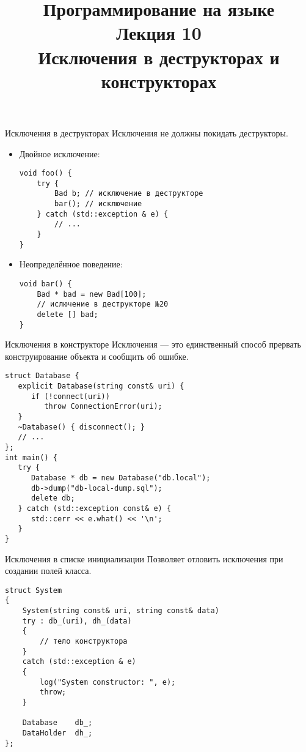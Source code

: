 \documentclass[aspectration=1610,t]{beamer}
\title{{\bf Программирование на языке \langcpp\protect\\Лекция
10\protect\vspace{1em}\\}Исключения в деструкторах и конструкторах}
\begin{document}
\begin{frame} 
  \titlepage
\end{frame}

\begin{frame}[fragile]{Исключения в деструкторах}
Исключения не должны покидать деструкторы.
\begin{itemize}
\item Двойное исключение:
\begin{lstlisting}
void foo() {
    try {
        Bad b; // исключение в деструкторе
        bar(); // исключение
    } catch (std::exception & e) {
        // ...
    }
}
\end{lstlisting}
\item Неопределённое поведение:
\begin{lstlisting}
void bar() {
    Bad * bad = new Bad[100];
    // ислючение в деструкторе №20
    delete [] bad;
}
\end{lstlisting}
\end{itemize}
\end{frame}

\begin{frame}[fragile]{Исключения в конструкторе}
Исключения — это единственный способ
прервать\\ конструирование объекта и сообщить об ошибке.

\begin{lstlisting}
struct Database {
   explicit Database(string const& uri) {
      if (!connect(uri))
         throw ConnectionError(uri);
   }
   ~Database() { disconnect(); }
   // ...
};
int main() {
   try {
      Database * db = new Database("db.local");
      db->dump("db-local-dump.sql");
      delete db;
   } catch (std::exception const& e) {
      std::cerr << e.what() << '\n';
   }
}

\end{lstlisting}
\end{frame}

\begin{frame}[fragile]{Исключения в списке инициализации}
Позволяет отловить исключения при создании полей класса.
\begin{lstlisting}
struct System 
{
    System(string const& uri, string const& data)
    try : db_(uri), dh_(data)
    {
        // тело конструктора
    }
    catch (std::exception & e) 
    {
        log("System constructor: ", e);
        throw;
    }
    
    Database    db_;
    DataHolder  dh_;
};   
\end{lstlisting}
\end{frame}
\end{document}
